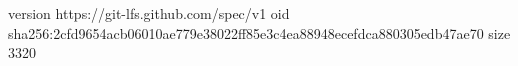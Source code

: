 version https://git-lfs.github.com/spec/v1
oid sha256:2cfd9654acb06010ae779e38022ff85e3c4ea88948ecefdca880305edb47ae70
size 3320
